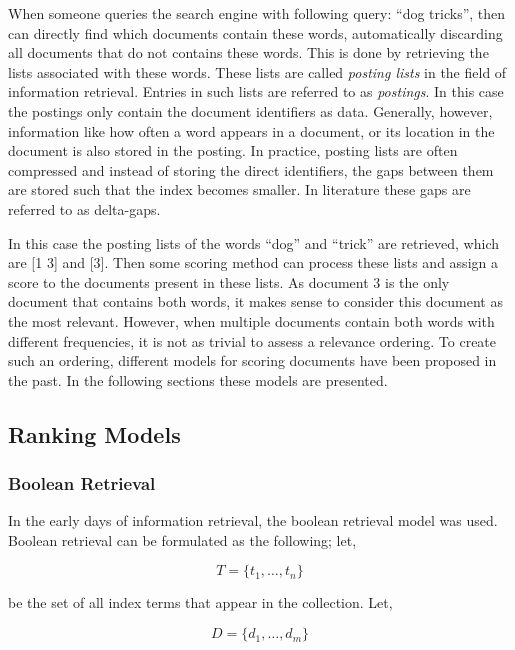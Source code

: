 When someone queries the search engine with following query: ``dog tricks'', then can directly find which documents contain these words, automatically discarding all documents that do not contains these words. This is done by retrieving the lists associated with these words. These lists are called \emph{posting lists} in the field of information retrieval. Entries in such lists are referred to as \emph{postings}. In this case the postings only contain the document identifiers as data. Generally, however, information like how often a word appears in a document, or its location in the document is also stored in the posting. In practice, posting lists are often compressed and instead of storing the direct identifiers, the gaps between them are stored such that the index becomes smaller. In literature these gaps are referred to as delta-gaps. 

In this case the posting lists of the words ``dog'' and ``trick'' are retrieved, which are [1 3] and [3]. Then some scoring method can process these lists and assign a score to the documents present in these lists. As document 3 is the only document that contains both words, it makes sense to consider this document as the most relevant. However, when multiple documents contain both words with different frequencies, it is not as trivial to assess a relevance ordering. 
To create such an ordering, different models for scoring documents have been proposed in the past. In the following sections these models are presented.

\subsection{Ranking Models}

\subsubsection{Boolean Retrieval}
In the early days of information retrieval, the boolean retrieval model was used. Boolean retrieval can be formulated as the following; let, 

\begin{equation}
	T = \{t_1, \ldots, t_n\}
\end{equation}

be the set of all index terms that appear in the collection. Let,

\begin{equation}
	D = \{d_1, \ldots, d_m\}
\end{equation}

